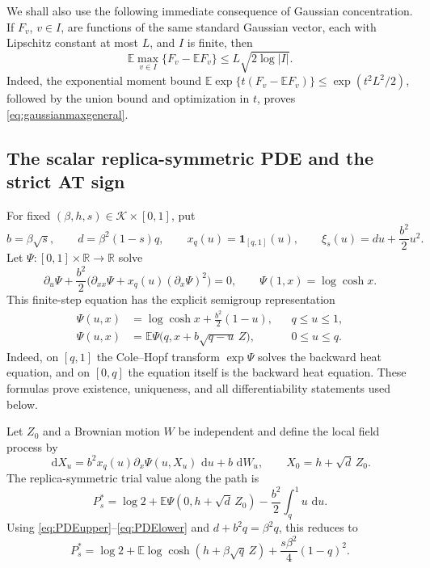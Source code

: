 \documentclass[11pt]{article}
\numberwithin{equation}{section}
\theoremstyle{plain}
\theoremstyle{definition}
\newcommand{\E}{\mathbb E}
\newcommand{\1}{\mathbf 1}
\newcommand{\cK}{\mathcal K}
\newcommand{\dd}{\,\mathrm d}
\begin{document}
We shall also use the following immediate consequence of Gaussian
concentration.  If $F_v$, $v\in I$, are functions of the same standard
Gaussian vector, each with Lipschitz constant at most $L$, and $I$ is
finite, then
\begin{equation}
 \E\max_{v\in I}\{F_v-\E F_v\}
 \le L\sqrt{2\log|I|}.
 \label{eq:gaussianmaxgeneral}
\end{equation}
Indeed, the exponential moment bound
$\E\exp\{t(F_v-\E F_v)\}\le\exp(t^2L^2/2)$, followed by the union
bound and optimization in $t$, proves \eqref{eq:gaussianmaxgeneral}.

\subsection{The scalar replica-symmetric PDE and the strict AT sign}\label{subsec:ATsign}

For fixed $(\beta,h,s)\in\cK\times[0,1]$, put
\begin{equation}
 b=\beta\sqrt s,\qquad d=\beta^2(1-s)q,
 \qquad x_q(u)=\1_{[q,1]}(u),\qquad
 \xi_s(u)=du+\frac{b^2}{2}u^2.
 \label{eq:bdxq}
\end{equation}
Let $\Psi:[0,1]\times\mathbb R\to\mathbb R$ solve
\begin{equation}
 \partial_u\Psi+\frac{b^2}{2}
 \bigl(\partial_{xx}\Psi+x_q(u)(\partial_x\Psi)^2\bigr)=0,
 \qquad \Psi(1,x)=\log\cosh x.
 \label{eq:parisipde}
\end{equation}
This finite-step equation has the explicit semigroup representation
\begin{align}
 \Psi(u,x)
 &=\log\cosh x+\frac{b^2}{2}(1-u), &&q\le u\le1,
 \label{eq:PDEupper}\\
 \Psi(u,x)
 &=\E\Psi\bigl(q,x+b\sqrt{q-u}\,Z\bigr), &&0\le u\le q.
 \label{eq:PDElower}
\end{align}
Indeed, on $[q,1]$ the Cole--Hopf transform $\exp\Psi$ solves the
backward heat equation, and on $[0,q]$ the equation itself is the
backward heat equation.  These formulas prove existence, uniqueness,
and all differentiability statements used below.

Let $Z_0$ and a Brownian motion $W$ be independent and define the local
field process by
\begin{equation}
 \dd X_u=b^2x_q(u)\partial_x\Psi(u,X_u)\,\dd u+b\,\dd W_u,
 \qquad X_0=h+\sqrt d\,Z_0.
 \label{eq:localfield}
\end{equation}
The replica-symmetric trial value along the path is
\begin{equation}
 P_s^*=\log2+\E\Psi(0,h+\sqrt d\,Z_0)
 -\frac{b^2}{2}\int_q^1u\,\dd u.
 \label{eq:scalartrial}
\end{equation}
Using \eqref{eq:PDEupper}--\eqref{eq:PDElower} and
$d+b^2q=\beta^2q$, this reduces to
\begin{equation}
 P_s^*=\log2+\E\log\cosh(h+\beta\sqrt q\,Z)
 +\frac{s\beta^2}{4}(1-q)^2.
 \label{eq:RSpathvalue}
\end{equation}
\end{document}
